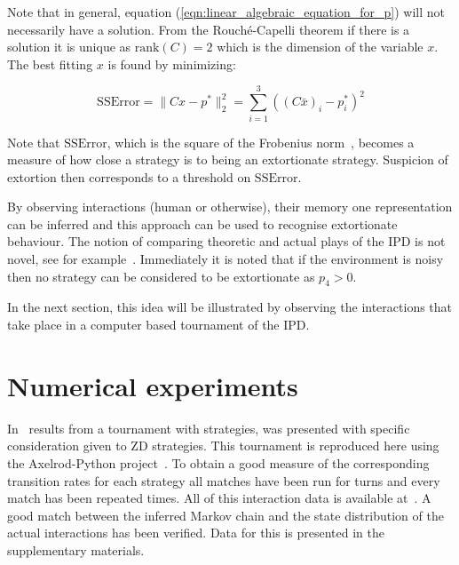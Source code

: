 \documentclass[a4paper]{article}
\begin{document}
Note that in general, equation (\ref{eqn:linear_algebraic_equation_for_p}) will
not necessarily have a solution. From the Rouch\'{e}-Capelli theorem if there is
a solution it is unique as \(\text{rank}(C)=2\) which is the dimension of the
variable \(x\). The best fitting \(x\) is found by minimizing:

\begin{equation}\label{eqn:r_squared}
    \text{SSError} = \|C x- p^*\|_2^2 = \sum_{i=1}^{3}\left((C\bar x)_i-p_i^*\right)^2
\end{equation}

Note that \(\text{SSError}\), which is the square of the Frobenius
norm~\cite{Golub2013}, becomes a measure of how close a strategy is to being an
extortionate strategy. Suspicion
of extortion then corresponds to a threshold on \(\text{SSError}\).

By observing interactions (human or otherwise), their memory one representation
can be inferred and this approach can be used to recognise extortionate
behaviour. The notion of comparing theoretic and actual plays of the IPD is not
novel, see for example~\cite{Rand2013}. Immediately it is noted that if the
environment is noisy~\cite{Wu1995} then no strategy can be considered to be
extortionate as \(p_4>0\).

In the next section, this idea will be illustrated by observing the interactions
that take place in a computer based tournament of the IPD\@.

\section{Numerical experiments}\label{sec:numerical-experiments}

In~\cite{Stewart2012} results from a tournament with
 strategies,
was presented with specific consideration given to ZD strategies. This
tournament is reproduced here using the Axelrod-Python
project~\cite{Knight2016}. To obtain a good measure of the corresponding
transition rates for each strategy all matches have been run for
 turns and every match has been
repeated  times. All of this
interaction data is available at~\cite{vincent_knight_2018_1297075}. A good
match between the inferred Markov chain and the state distribution of the actual
interactions has been verified. Data for this is presented in the supplementary
materials.
\end{document}
